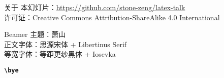\begin{frame}{关于}
\vspace*{1.2cm}
\footnotesize
本幻灯片：\url{https://github.com/stone-zeng/latex-talk} \\
许可证：Creative Commons Attribution-ShareAlike 4.0 International
\vspace{0.4cm}
\begin{center}
  \huge\ccbysa
\end{center}
\vspace{2cm}
\begin{flushleft}
  \tiny
  Beamer 主题：萧山  \\
  正文字体：思源宋体 + Libertinus Serif \\
  等宽字体：等距更纱黑体 + Iosevka
\end{flushleft}
\vspace{-0.5cm}
\end{frame}

\begin{frame}[standout]
  \huge \textbf{\texttt{\textbackslash bye}}
\end{frame}
